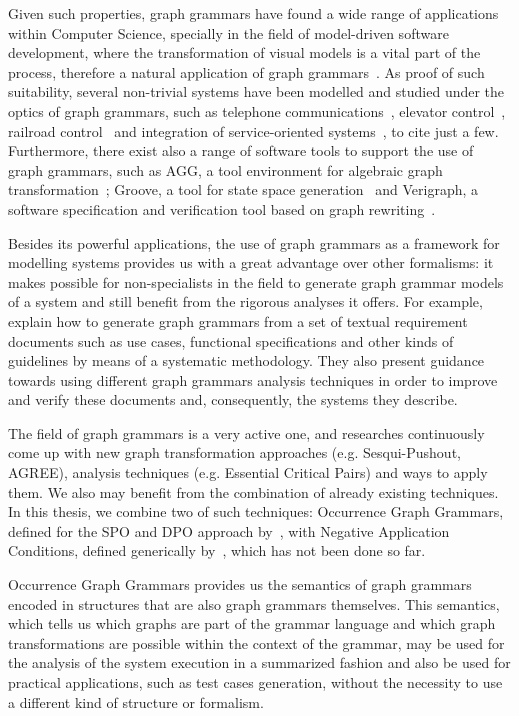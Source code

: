 Given such properties, graph grammars have found a wide range of applications within Computer Science, specially in the field of model-driven software development, where the transformation of visual models is a vital part of the process, therefore a natural application of graph grammars~\cite{Rozenberg1997}. As proof of such suitability, several non-trivial systems have been modelled and studied under the optics of graph grammars, such as telephone communications~\cite{Ribeiro1996}, elevator control~\cite{Lambers2010}, railroad control~\cite{Pennemann2009} and integration of service-oriented systems~\cite{Giese2015}, to cite just a few. Furthermore, there exist also a range of software tools to support the use of graph grammars, such as AGG, a tool environment for algebraic graph transformation~\cite{Taentzer2000}; Groove, a tool for state space generation~\cite{Rensink2004} and Verigraph, a software specification and verification tool based on graph rewriting~\cite{verigraph}.

Besides its powerful applications, the use of graph grammars as a framework for modelling systems provides us with a great advantage over other formalisms: it makes possible for non-specialists in the field to generate graph grammar models of a system and still benefit from the rigorous analyses it offers. For example, ~\cite{Junior2015,BezerraWEIT2016,Cota2017} explain how to generate graph grammars from a set of textual requirement documents such as use cases, functional specifications and other kinds of guidelines by means of a systematic methodology. They also present guidance towards using different graph grammars analysis techniques in order to improve and verify these documents and, consequently, the systems they describe.

The field of graph grammars is a very active one, and researches continuously come up with new graph transformation approaches (e.g. Sesqui-Pushout, AGREE), analysis techniques (e.g. Essential Critical Pairs) and ways to apply them. We also may benefit from the combination of already existing techniques. In this thesis, we combine two of such techniques: Occurrence Graph Grammars, defined for the SPO and DPO approach by~\cite{Ribeiro1996, Corradini1996}, with Negative Application Conditions, defined generically by~\cite{Habel1996}, which has not been done so far. 

Occurrence Graph Grammars provides us the semantics of graph grammars encoded in structures that are also graph grammars themselves. This semantics, which tells us which graphs are part of the grammar language and which graph transformations are possible within the context of the grammar, may be used for the analysis of the system execution in a summarized fashion and also be used for practical applications, such as test cases generation, without the necessity to use a different kind of structure or formalism.


